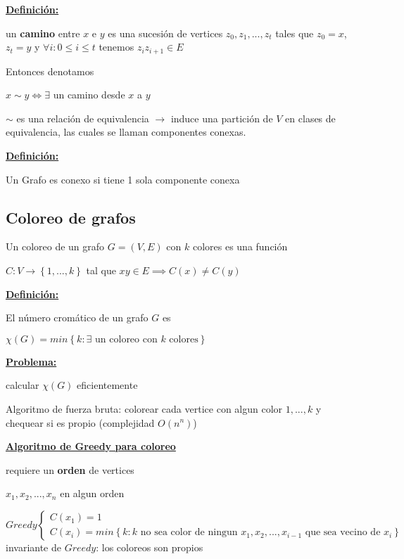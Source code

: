 \documentclass{article}
\begin{document}
\underline{\textbf{Definición:}}

un \textbf{camino} entre \(x\) e \(y\) es una sucesión de vertices \(z_0, z_1, ..., z_t\) tales que \(z_0 = x\), \(z_t = y\) y \(\forall i  : 0 \leq i \leq t\) tenemos  \(z_{i}z_{i+1} \in E\)

Entonces denotamos 

\(x \sim y \iff \exists\) un camino desde \(x\) a \(y\)

$\sim$ es una relación de equivalencia $\rightarrow$ induce una partición de $V$ en clases de equivalencia, las cuales se llaman componentes conexas. \bigskip

\underline{\textbf{Definición:}}

Un Grafo es conexo si tiene 1 sola componente conexa

\subsection*{Coloreo de grafos}

Un coloreo de un grafo $G = (V, E)$ con $k$ colores es una función 

\(C : V \rightarrow \left\{1, ..., k\right\}\) tal que \(xy \in E \implies C(x) \neq C(y)\) \bigskip

\underline{\textbf{Definición:}}

El número cromático de un grafo $G$ es

\(\chi(G) = min\left\{k : \exists \text{ un coloreo con } k \text{ colores}\right\} \)

\underline{\textbf{Problema:}}

calcular $\chi(G)$ eficientemente

Algoritmo de fuerza bruta: colorear cada vertice con algun color $1, ..., k$ y chequear si es propio (complejidad $O(n^n)$) \bigskip

\underline{\textbf{Algoritmo de Greedy para coloreo}}

requiere un \textbf{orden} de vertices 

\(x_1, x_2, ..., x_n\) en algun orden \bigskip

\(
Greedy 
\begin{cases}
C(x_1) = 1 \\
C(x_i) = min\left\{k : k \text{ no sea color de ningun } x_1, x_2, ..., x_{i - 1} \text{ que sea vecino de } x_i\right\}
\end{cases}
\) \\

invariante de $Greedy$: los coloreos son propios \bigskip
\end{document}
